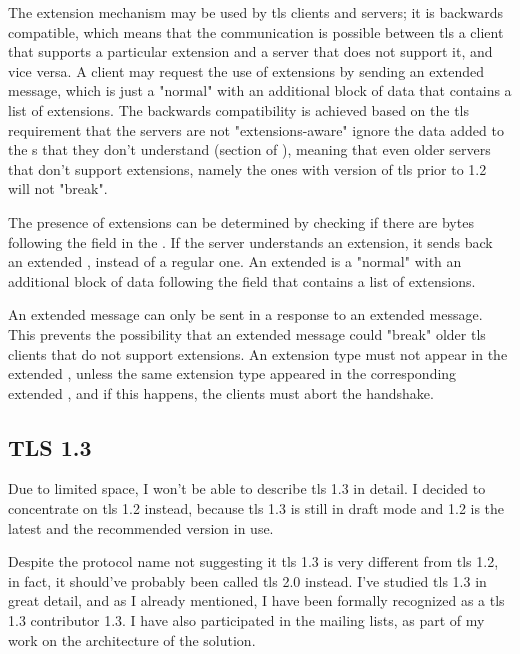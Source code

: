 \documentclass{llncs}
\begin{document}
The extension mechanism may be used by \gls{tls} clients and servers; it is backwards
compatible, which means that the communication is possible between \gls{tls} a
client that supports a particular extension and a server that does not support it,
and vice versa. A client may request the use of extensions by sending an extended 
message, which is just a "normal"  with an additional
block of data that contains a list of extensions. The backwards compatibility is achieved based on the \gls{tls}
requirement that the servers are not "extensions-aware" ignore the data
added to the s that they don't understand (section  of \cite{RFC2246}),
meaning that even older servers that don't support extensions, namely the ones with
version of \gls{tls} prior to 1.2 will not "break".

The presence of extensions can be determined by checking if there are bytes
following the  field in the .
If the server understands an extension, it sends back an extended ,
instead of a regular one. An extended  is a "normal"
 with an additional block of data following the
 field that contains a list of extensions.

An extended  message can only be sent in a response to an
extended  message. This prevents the possibility that an extended
 message could "break" older \gls{tls} clients that do not
support extensions. An extension type must not appear in the
extended , unless the same extension type appeared in the
corresponding extended , and if this happens, the clients must abort the handshake.

\subsection{TLS 1.3}

Due to limited space, I won't be able to describe \gls{tls} 1.3 in detail. I decided
to concentrate on \gls{tls} 1.2 instead, because \gls{tls} 1.3 is still in draft
mode and 1.2 is the latest and the recommended version in use.

Despite the protocol name not suggesting it \gls{tls} 1.3 is
very different from \gls{tls} 1.2, in fact, it should've probably been called
\gls{tls} 2.0 instead. I've studied \gls{tls} 1.3 in great detail, and as I already mentioned,
I have been formally recognized as a \gls{tls} 1.3 contributor 1.3.
I have also participated in the mailing lists, as part of my work on the architecture of the solution.
\end{document}
